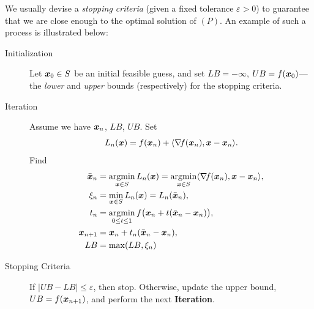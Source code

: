 We usually devise a \emph{stopping criteria} (given a fixed tolerance $\varepsilon>0$) to guarantee that we are close enough to the optimal solution of $(P)$.  An example of such a process is illustrated below:
\begin{description}
\item [Initialization] Let $\boldsymbol{x}_0 \in S$ be an initial feasible guess, and set $LB=-\infty$, $UB=f(\boldsymbol{x}_0)$---the \emph{lower} and \emph{upper} bounds (respectively) for the stopping criteria.
\item [Iteration] Assume we have $\boldsymbol{x}_n$, $LB$, $UB$.  Set 
\begin{equation*}
L_n(\boldsymbol{x}) = f(\boldsymbol{x}_n) + \langle \mathop{\nabla\! {f}}(\boldsymbol{x}_n), \boldsymbol{x}-\boldsymbol{x}_n \rangle. 
\end{equation*}
Find
\begin{align*}
\bar{\boldsymbol{x}}_n &= \operatorname*{argmin}_{\boldsymbol{x} \in S} L_n(\boldsymbol{x}) = \operatorname*{argmin}_{\boldsymbol{x} \in S} \langle \mathop{\nabla\! {f}}(\boldsymbol{x}_n), \boldsymbol{x}-\boldsymbol{x}_n \rangle,\\
\xi_n &= \min_{\boldsymbol{x} \in S} L_n(\boldsymbol{x}) = L_n(\bar{\boldsymbol{x}}_n),\\
t_n &= \operatorname*{argmin}_{0 \leq t \leq 1} f\big(\boldsymbol{x}_n + t(\bar{\boldsymbol{x}}_n - \boldsymbol{x}_n)\big), \\
\boldsymbol{x}_{n+1} &= \boldsymbol{x}_n + t_n (\bar{\boldsymbol{x}}_n - \boldsymbol{x}_n), \\
LB &= \max(LB, \xi_n)
\end{align*}
\item [Stopping Criteria] If $\lvert UB-LB \rvert \leq \varepsilon$, then stop. Otherwise, update the upper bound, $UB = f(\boldsymbol{x}_{n+1})$, and perform the next \textbf{Iteration}.
\end{description}

